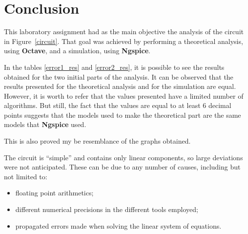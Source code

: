 \section{Conclusion}
\label{sec:conclusion}

This laboratory assignment had as the main objective the analysis of the circuit in Figure~\ref{circuit}. That goal was achieved by performing a theoretical analysis, using {\bf Octave}, and a simulation, using {\bf Ngspice}.

In the tables \ref{error1_res} and \ref{error2_res}, it is possible to see the results obtained for the two initial parts of the analysis. It can be observed that the results presented for the theoretical analysis and for the simulation are equal. However, it is worth to refer that the values presented have a limited number of algorithms. But still, the fact that the values are equal to at least 6 decimal points suggests that the models used to make the theoretical part are the same models that {\bf Ngspice} used.

This is also proved my be resemblance of the graphs obtained.



The circuit is ``simple'' and contains only linear components, so large deviations were not anticipated. These can be due to any number of causes, including but not limited to:

\begin{itemize}
\item floating point arithmetics;
\item different numerical precisions in the different tools employed;
\item propagated errors made when solving the linear system of equations.
\end{itemize}


